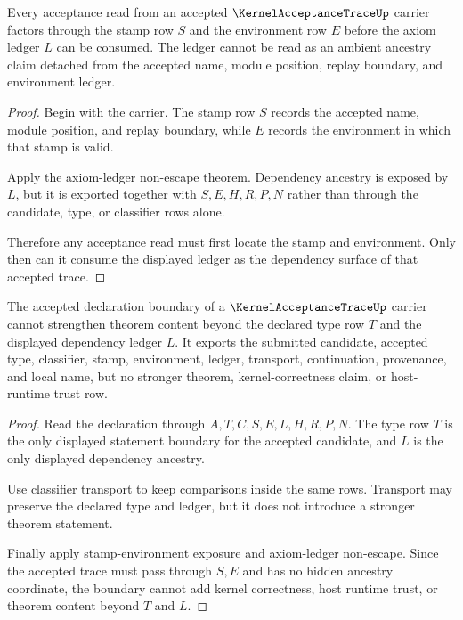 \begin{theorem}
\label{thm:kernel-acceptance-trace-stamp-environment-exposure}
Every acceptance read from an accepted $\KernelAcceptanceTraceUp$ carrier factors through the stamp row $S$ and the environment row $E$ before the axiom ledger $L$ can be consumed. The ledger cannot be read as an ambient ancestry claim detached from the accepted name, module position, replay boundary, and environment ledger.
\end{theorem}
\begin{proof}
Begin with the carrier. The stamp row $S$ records the accepted name, module position, and replay boundary, while $E$ records the environment in which that stamp is valid.

Apply the axiom-ledger non-escape theorem. Dependency ancestry is exposed by $L$, but it is exported together with $S,E,H,R,P,N$ rather than through the candidate, type, or classifier rows alone.

Therefore any acceptance read must first locate the stamp and environment. Only then can it consume the displayed ledger as the dependency surface of that accepted trace.
\end{proof}

\begin{theorem}
\label{thm:kernel-acceptance-trace-accepted-declaration-boundary}
The accepted declaration boundary of a $\KernelAcceptanceTraceUp$ carrier cannot strengthen theorem content beyond the declared type row $T$ and the displayed dependency ledger $L$. It exports the submitted candidate, accepted type, classifier, stamp, environment, ledger, transport, continuation, provenance, and local name, but no stronger theorem, kernel-correctness claim, or host-runtime trust row.
\end{theorem}
\begin{proof}
Read the declaration through $A,T,C,S,E,L,H,R,P,N$. The type row $T$ is the only displayed statement boundary for the accepted candidate, and $L$ is the only displayed dependency ancestry.

Use classifier transport to keep comparisons inside the same rows. Transport may preserve the declared type and ledger, but it does not introduce a stronger theorem statement.

Finally apply stamp-environment exposure and axiom-ledger non-escape. Since the accepted trace must pass through $S,E$ and has no hidden ancestry coordinate, the boundary cannot add kernel correctness, host runtime trust, or theorem content beyond $T$ and $L$.
\end{proof}

